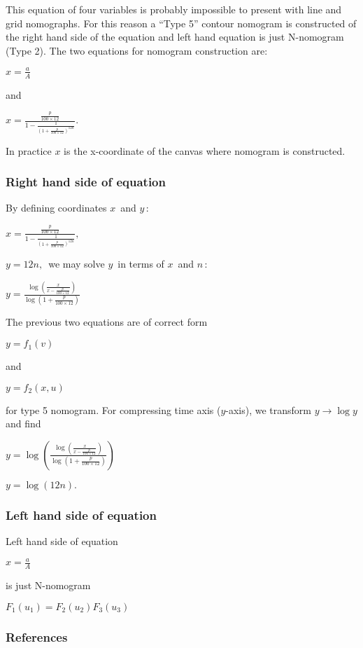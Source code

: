 \documentclass[a4paper,11pt,english]{sphinxmanual}
\begin{document}
This equation of four variables is probably impossible to present with
line and grid nomographs. For this reason a “Type 5” contour nomogram is
constructed of the right hand side of the equation and left hand
equation is just N-nomogram (Type 2). The two equations for nomogram
construction are:

\(x = \frac{a}{A}\)

and

\(x = \frac{\frac{p}{100\times 12}}{1-\frac{1}{(1+\frac{p}{100\times 12})^{12n}}}.\)

In practice \(x\) is the x-coordinate of the canvas where nomogram
is constructed.


\subsubsection{Right hand side of equation}
\label{\detokenize{examples/examples:right-hand-side-of-equation}}
By defining coordinates \(x\,\) and \(y\,\):

\(x = \frac{\frac{p}{100\times 12}}{1-\frac{1}{(1+\frac{p}{100\times 12})^{12n}}},\)

\(y = 12n, \,\) we may solve \(y\,\) in terms of \(x\,\) and
\(n\,\):

\(y = \frac{\log (\frac{x}{x-\frac{p}{100\times 12}})}{\log (1+\frac{p}{100 \times 12})} \,\)

The previous two equations are of correct form

\(y = f_1(v) \,\)

and

\(y = f_2(x,u) \,\)

for type 5 nomogram. For compressing time axis (\(y\)-axis), we
transform \(y \rightarrow \log y\) and find

\(y = \log \left( \frac{\log (\frac{x}{x-\frac{p}{100\times 12}})}{\log (1+\frac{p}{100 \times 12})} \right)\,\)

\(y = \log( 12n ). \,\)


\subsubsection{Left hand side of equation}
\label{\detokenize{examples/examples:left-hand-side-of-equation}}
Left hand side of equation

\(x = \frac{a}{A}\)

is just N-nomogram

\(F_1(u_1) = F_2(u_2)F_3(u_3) \,\)


\subsubsection{References}
\label{\detokenize{examples/examples:references}}
\end{document}

